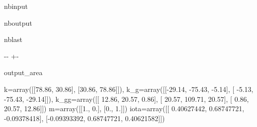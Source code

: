 \documentclass[letterpaper,10pt,english]{sphinxmanual}
\begin{document}
\begin{sphinxuseclass}{nbinput}
{\begin{sphinxVerbatim}[commandchars=\\\{\}]
  


  

\end{sphinxVerbatim}
}

\end{sphinxuseclass}
\begin{sphinxuseclass}{nboutput}
\begin{sphinxuseclass}{nblast}
{

\kern-\sphinxverbatimsmallskipamount\kern-\baselineskip
\kern+\FrameHeightAdjust\kern-\fboxrule
\vspace{\nbsphinxcodecellspacing}

\begin{sphinxuseclass}{output_area}
\begin{sphinxuseclass}{}


\begin{sphinxVerbatim}[commandchars=\\\{\}]
k=array([[78.86, 30.86],
       [30.86, 78.86]]),
k\_g=array([[-29.14, -75.43,  -5.14],
       [ -5.13, -75.43, -29.14]]),
k\_gg=array([[ 12.86,  20.57,   0.86],
       [ 20.57, 109.71,  20.57],
       [  0.86,  20.57,  12.86]])
m=array([[1., 0.],
       [0., 1.]])
iota=array([[ 0.40627442,  0.68747721, -0.09378418],
       [-0.09393392,  0.68747721,  0.40621582]])
\end{sphinxVerbatim}



\end{sphinxuseclass}
\end{sphinxuseclass}
}

\end{sphinxuseclass}
\end{sphinxuseclass}
\end{document}
